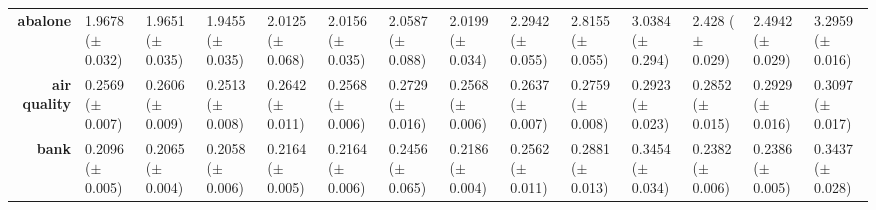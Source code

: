 \begin{sidewaystable}[htbp]
{\begin{tabular}{r|lll|l|l|l|l|l|lllll}
			\textbf{abalone}                    & \cellcolor[rgb]{ .506,  .776,  .486}1.9678 ($\pm$0.032)                        & \cellcolor[rgb]{ .494,  .773,  .486}1.9651 ($\pm$0.035) & \cellcolor[rgb]{ .388,  .745,  .482}1.9455 ($\pm$0.035) & \cellcolor[rgb]{ .749,  .847,  .502}2.0125 ($\pm$0.068) & \cellcolor[rgb]{ .765,  .851,  .502}2.0156 ($\pm$0.035) & \cellcolor[rgb]{ 1,  .922,  .518}2.0587 ($\pm$0.088)    & \cellcolor[rgb]{ .788,  .859,  .502}2.0199 ($\pm$0.034) & \cellcolor[rgb]{ .996,  .827,  .502}2.2942 ($\pm$0.055) & \cellcolor[rgb]{ .984,  .612,  .459}2.8155 ($\pm$0.055) & \cellcolor[rgb]{ .98,  .522,  .443}3.0384 ($\pm$0.294)  & \cellcolor[rgb]{ .992,  .773,  .49}2.428 ($\pm$0.029)   & \cellcolor[rgb]{ .992,  .745,  .486}2.4942 ($\pm$0.029) & \cellcolor[rgb]{ .973,  .412,  .42}3.2959 ($\pm$0.016)  \\
			\textbf{air quality}                & \cellcolor[rgb]{ .651,  .82,  .494}0.2569 ($\pm$0.007)                         & \cellcolor[rgb]{ .827,  .871,  .506}0.2606 ($\pm$0.009) & \cellcolor[rgb]{ .388,  .745,  .482}0.2513 ($\pm$0.008) & \cellcolor[rgb]{ 1,  .922,  .518}0.2642 ($\pm$0.011)    & \cellcolor[rgb]{ .647,  .82,  .494}0.2568 ($\pm$0.006)  & \cellcolor[rgb]{ .996,  .827,  .502}0.2729 ($\pm$0.016) & \cellcolor[rgb]{ .647,  .82,  .494}0.2568 ($\pm$0.006)  & \cellcolor[rgb]{ .976,  .914,  .514}0.2637 ($\pm$0.007) & \cellcolor[rgb]{ .996,  .792,  .494}0.2759 ($\pm$0.008) & \cellcolor[rgb]{ .984,  .608,  .459}0.2923 ($\pm$0.023) & \cellcolor[rgb]{ .988,  .69,  .475}0.2852 ($\pm$0.015)  & \cellcolor[rgb]{ .984,  .604,  .459}0.2929 ($\pm$0.016) & \cellcolor[rgb]{ .973,  .412,  .42}0.3097 ($\pm$0.017)  \\
			\textbf{bank}                       & \cellcolor[rgb]{ .459,  .765,  .486}0.2096 ($\pm$0.005)                        & \cellcolor[rgb]{ .4,  .745,  .482}0.2065 ($\pm$0.004)   & \cellcolor[rgb]{ .388,  .745,  .482}0.2058 ($\pm$0.006) & \cellcolor[rgb]{ .588,  .8,  .49}0.2164 ($\pm$0.005)    & \cellcolor[rgb]{ .588,  .8,  .49}0.2164 ($\pm$0.006)    & \cellcolor[rgb]{ 1,  .886,  .514}0.2456 ($\pm$0.065)    & \cellcolor[rgb]{ .627,  .812,  .494}0.2186 ($\pm$0.004) & \cellcolor[rgb]{ .996,  .839,  .502}0.2562 ($\pm$0.011) & \cellcolor[rgb]{ .988,  .686,  .475}0.2881 ($\pm$0.013) & \cellcolor[rgb]{ .973,  .412,  .42}0.3454 ($\pm$0.034)  & \cellcolor[rgb]{ 1,  .922,  .518}0.2382 ($\pm$0.006)    & \cellcolor[rgb]{ 1,  .922,  .518}0.2386 ($\pm$0.005)    & \cellcolor[rgb]{ .976,  .424,  .424}0.3437 ($\pm$0.028) \\

\end{tabular}}
\end{sidewaystable}
